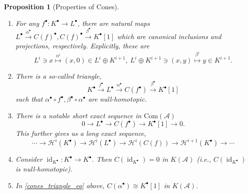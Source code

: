 \documentclass[10pt]{article}
\numberwithin{equation}{section}
\newtheorem{proposition}{Proposition}[section]
\DeclareMathOperator{\id}{id}
\newcommand{\cH}[0]{\mathcal{H}}
\newcommand{\sA}[0]{\mathscr{A}}
\newcommand{\Com}[0]{\mathrm{Com}}
\begin{document}
\begin{proposition}[Properties of Cones]$\:$
    \begin{enumerate}
        \item For any $f^\bullet:K^\bullet\to L^\bullet$, there are natural maps $L^\bullet\stackrel{\alpha^\bullet}{\to} C(f)^\bullet, C(f)^\bullet\stackrel{\beta^\bullet}{\to} K^\bullet[1]$ which are canonical inclusions and projections, respectively.
        Explicitly, these are 
        \begin{equation*}
            L^i\ni x\stackrel{\alpha^i}{\mapsto} (x,0)\in L^i\oplus K^{i+1},\: L^i\oplus K^{i+1}\ni (x,y)\stackrel{\beta^i}{\mapsto} y\in K^{i+1}.
        \end{equation*} 
        \item There is a so-called triangle,
        \begin{equation*}
            \label{cones_triangle_eq}
            K^\bullet\stackrel{f^\bullet}{\to} L^\bullet \stackrel{\alpha^\bullet}{\to} C(f^\bullet)\stackrel{\beta^\bullet}{\to} K^\bullet[1]\tag{T}
        \end{equation*}
        such that $\alpha^\bullet\circ f^\bullet,\beta^\bullet\circ\alpha^\bullet$ are null-homotopic.
        \item There is a notable short exact sequence in $\Com(\sA)$ 
        \begin{equation*}
            0\to L^\bullet\to C(f^\bullet)\to K^\bullet[1]\to0.
        \end{equation*}
        This further gives us a long exact sequence,
        \begin{equation*}
            \cdots\to \cH^i(K^\bullet)\to \cH^i(L^\bullet)\to \cH^i(C(f))\to \cH^{i+1}(K^\bullet)\to\cdots
        \end{equation*}
        \item Consider $\id_{K^\bullet}:K^\bullet\to K^\bullet$. Then $C(\id_{K^\bullet}) = 0$ in $K(\sA)$ (i.e., $C(\id_{K^\bullet})$ is null-homotopic).
        \item In \eqref{cones_triangle_eq} above, $C(\alpha^\bullet)\cong K^\bullet[1]$ in $K(\sA)$.
    \end{enumerate}
\end{proposition}
\end{document}
